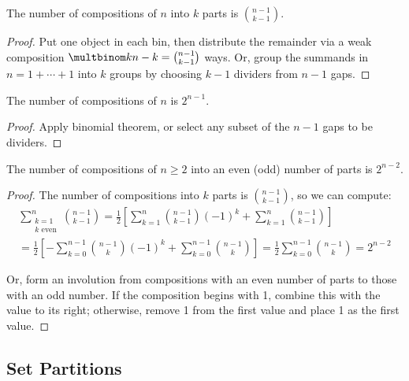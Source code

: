 \documentclass[a4paper]{article}
\begin{document}
\begin{theorem}
The number of compositions of $n$ into $k$ parts is $\binom{n-1}{k-1}$.

\begin{hl}
\begin{proof}
Put one object in each bin, then distribute the remainder via a weak composition $\multbinom k{n-k}=\binom{n-1}{k-1}$ ways. Or, group the summands in $n=1+\cdots+1$ into $k$ groups by choosing $k-1$ dividers from $n-1$ gaps.
\end{proof}
\end{hl}
\end{theorem}

\begin{theorem}
The number of compositions of $n$ is $2^{n-1}$.

\begin{hl}
\begin{proof}
Apply binomial theorem, or select any subset of the $n-1$ gaps to be dividers.
\end{proof}
\end{hl}
\end{theorem}

\begin{theorem}
The number of compositions of $n\geq2$ into an even (odd) number of parts is $2^{n-2}$.

\begin{hl}
\begin{proof}
The number of compositions into $k$ parts is $\binom{n-1}{k-1}$, so we can compute:
\begin{multline*}
\sum_{\substack{k=1\\k\text{ even}}}^n\binom{n-1}{k-1}
=\frac12\left[\sum_{k=1}^n\binom{n-1}{k-1}(-1)^k+\sum_{k=1}^n\binom{n-1}{k-1}\right]\\
=\frac12\left[-\sum_{k=0}^{n-1}\binom{n-1}{k}(-1)^k+\sum_{k=0}^{n-1}\binom{n-1}{k}\right]
=\frac12\sum_{k=0}^{n-1}\binom{n-1}k=2^{n-2}
\end{multline*}

Or, form an involution from compositions with an even number of parts to those with an odd number. If the composition begins with 1, combine this with the value to its right; otherwise, remove 1 from the first value and place 1 as the first value.
\end{proof}
\end{hl}
\end{theorem}

\subsection{Set Partitions}
\end{document}
